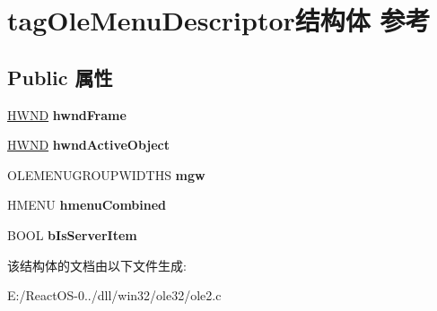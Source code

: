 \hypertarget{structtag_ole_menu_descriptor}{}\section{tag\+Ole\+Menu\+Descriptor结构体 参考}
\label{structtag_ole_menu_descriptor}
\subsection*{Public 属性}
\begin{DoxyCompactItemize}
\item 
\mbox{\label{structtag_ole_menu_descriptor_a7dc782d213c197086b8825b287d994b8}} 
\hyperlink{interfacevoid}{H\+W\+ND} {\bfseries hwnd\+Frame}
\item 
\mbox{\label{structtag_ole_menu_descriptor_a9c91a81ebfa7b88938753c63b084f7d4}} 
\hyperlink{interfacevoid}{H\+W\+ND} {\bfseries hwnd\+Active\+Object}
\item 
\mbox{\label{structtag_ole_menu_descriptor_ad0e61f75ba91a209666f77587f613411}} 
O\+L\+E\+M\+E\+N\+U\+G\+R\+O\+U\+P\+W\+I\+D\+T\+HS {\bfseries mgw}
\item 
\mbox{\label{structtag_ole_menu_descriptor_a98009b720438823928cb38b9093a85ac}} 
H\+M\+E\+NU {\bfseries hmenu\+Combined}
\item 
\mbox{\label{structtag_ole_menu_descriptor_a2d2dbce52823d4ba16b3d3905031d2fe}} 
B\+O\+OL {\bfseries b\+Is\+Server\+Item}
\end{DoxyCompactItemize}


该结构体的文档由以下文件生成\+:\begin{DoxyCompactItemize}
\item 
E\+:/\+React\+O\+S-\/0../dll/win32/ole32/ole2.\+c\end{DoxyCompactItemize}

